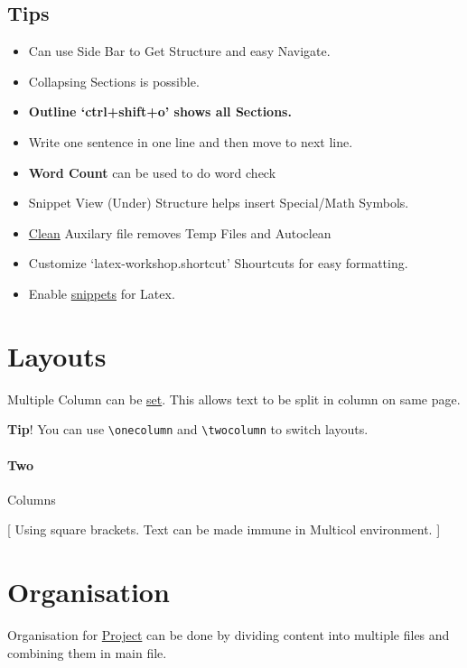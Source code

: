 \documentclass{report}[a4paper,12pt] %
\begin{document}
\subsection{Tips}
\begin{itemize}
  \item Can use Side Bar to Get Structure and easy Navigate.
  \item Collapsing Sections is possible.
  \item \textbf{Outline `ctrl+shift+o' shows all Sections.}
  \item Write one sentence in one line and then move to next line.
  \item \textbf{Word Count} can be used to do word check
  \item Snippet View (Under) Structure helps insert Special/Math Symbols.
  \item \href{https://github.com/James-Yu/LaTeX-Workshop/wiki/Compile#cleaning-generated-files}{Clean} Auxilary file removes Temp Files and Autoclean
  \item Customize `latex-workshop.shortcut' Shourtcuts for easy formatting.
  \item Enable \href{https://github.com/James-Yu/LaTeX-Workshop/issues/912}{snippets} for Latex.
\end{itemize}

\section{Layouts}
Multiple Column can be \href{https://www.overleaf.com/learn/latex/Multiple_columns}{set}. This allows text to be split in column on same page.

\begin{tcolorbox}
  \textbf{Tip}! You can use \verb|\onecolumn| and \verb|\twocolumn| to switch layouts.
\end{tcolorbox}

\paragraph{Two} Columns
\begin{multicols}{2}
  \setlength{\columnseprule}{1pt}
  \def\columnseprulecolor{\color{blue}}

  [
  Using square brackets. Text can be made immune in Multicol environment.
  ]
  \lipsum[2]
\end{multicols}

\section{Organisation}
Organisation for \href{https://www.overleaf.com/learn/latex/Management_in_a_large_project}{Project} can be done by dividing content into multiple files
and combining them in main file.
\end{document}
